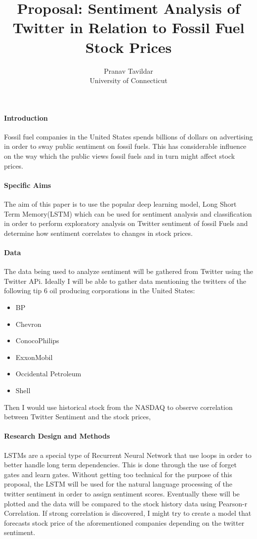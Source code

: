 \documentclass[12pt]{article}
\title{Proposal: Sentiment Analysis of Twitter in Relation to Fossil Fuel Stock Prices}
\author{Pranav Tavildar\\
  University of Connecticut
}
\begin{document}
\maketitle


\paragraph{Introduction}
Fossil fuel companies in the United States spends billions of dollars on advertising in order to sway public sentiment on fossil fuels. This has considerable influence on the way which the public views fossil fuels and in turn might affect stock prices.

\paragraph{Specific Aims}
The aim of this paper is to use the popular deep learning model, Long Short Term Memory(LSTM) which can be used for sentiment analysis and classification in order to perform exploratory analysis on Twitter sentiment of fossil Fuels and determine how sentiment correlates to changes in stock prices.

\paragraph{Data}
The data being used to analyze sentiment will be gathered from Twitter using the Twitter APi. Ideally I will be able to gather data mentioning the twitters of the following tip 6 oil producing corporations in the United States:
\begin{itemize}
    \item BP
    \item Chevron
    \item ConocoPhilips
    \item ExxonMobil
    \item Occidental Petroleum
    \item Shell
\end{itemize}

Then I would use historical stock from the NASDAQ to observe correlation between Twitter Sentiment and the stock prices,

\paragraph{Research Design and Methods}
LSTMs are a special type of Recurrent Neural Network that use loops in order to better handle long term dependencies. This is done through the use of forget gates and learn gates. Without getting too technical for the purpose of this proposal, the LSTM will be used for the natural language processing of the twitter sentiment in order to assign sentiment scores. Eventually these will be plotted and the data will be compared to the stock history data using Pearson-r Correlation. If strong correlation is discovered, I might try to create a model that forecasts stock price of the aforementioned companies depending on the twitter sentiment.
\end{document}

